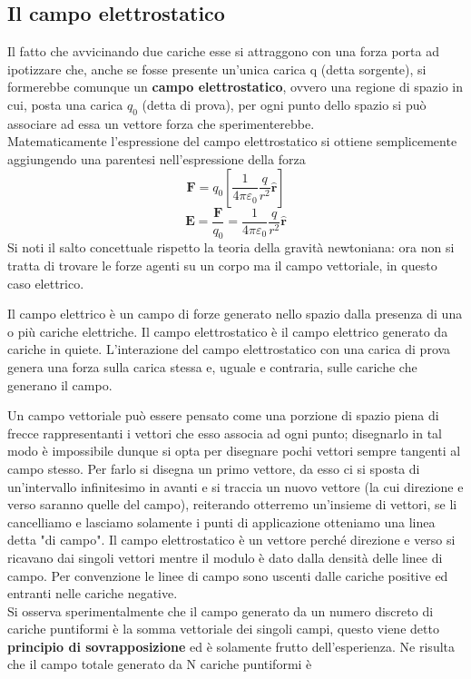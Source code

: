 \documentclass[
10pt, %
a4paper, %
oneside, %
headinclude,footinclude, %
BCOR5mm, %
]{scrartcl}
\begin{document}
\subsection{Il campo elettrostatico}
Il fatto che avvicinando due cariche esse si attraggono con una forza porta ad ipotizzare che, anche se fosse presente un'unica carica q (detta sorgente), si formerebbe comunque un \textbf{campo elettrostatico}, ovvero una regione di spazio in cui, posta una carica \(q_0\) (detta di prova), per ogni punto dello spazio si può associare ad essa un vettore forza che sperimenterebbe.\\
Matematicamente l'espressione del campo elettrostatico si ottiene semplicemente aggiungendo una parentesi nell'espressione della forza 
\[\mathbf{F}=q_0\left[\frac{1}{4\pi\varepsilon_0}\frac{q}{r^2}\hat{\mathbf{r}}\right]\]
\[\mathbf{E} = \frac{\mathbf{F}}{q_0} = \frac{1}{4\pi\varepsilon_0}\frac{q}{r^2}\hat{\mathbf{r}}\]
Si noti il salto concettuale rispetto la teoria della gravità newtoniana: ora non si tratta di trovare le forze agenti su un corpo ma il campo vettoriale, in questo caso elettrico.
\begin{definizione}
	 Il campo elettrico è un campo di forze generato nello spazio dalla presenza di una o più cariche elettriche. Il campo elettrostatico è il campo elettrico generato da cariche in quiete. L'interazione del campo elettrostatico con una carica di prova genera una forza sulla carica stessa e, uguale e contraria, sulle cariche che generano il campo.
\end{definizione}
Un campo vettoriale può essere pensato come una porzione di spazio piena di frecce rappresentanti i vettori che esso associa ad ogni punto; disegnarlo in tal modo è impossibile dunque si opta per disegnare pochi vettori sempre tangenti al campo stesso. Per farlo si disegna un primo vettore, da esso ci si sposta di un'intervallo infinitesimo in avanti e si traccia un nuovo vettore (la cui direzione e verso saranno quelle del campo), reiterando otterremo un'insieme di vettori, se li cancelliamo e lasciamo solamente i punti di applicazione otteniamo una linea detta "di campo". Il campo elettrostatico è un vettore perché direzione e verso si ricavano dai singoli vettori mentre il modulo è dato dalla densità delle linee di campo. Per convenzione le linee di campo sono uscenti dalle cariche positive ed entranti nelle cariche negative.\\
Si osserva sperimentalmente che il campo generato da un numero discreto di cariche puntiformi è la somma vettoriale dei singoli campi, questo viene detto \textbf{principio di sovrapposizione} ed è solamente frutto dell'esperienza. Ne risulta che il campo totale generato da N cariche puntiformi è
\end{document}
